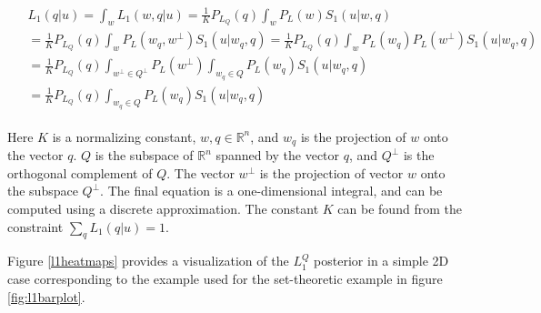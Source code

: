 \documentclass[OpenMind]{stjour}
\newcommand{\Listener}{L}
\newcommand{\QLONE}{\Listener_{{1}}^{{Q}}}
\begin{document}



















	 \begin{align}
	 \begin{split}
	&L_1(q | u) = \int_{w}L_1(w,q | u)
	= \frac{1}{K}P_{L_Q}(q) \int_{w}P_L(w)S_1(u|w,q)  \\
	&= \frac{1}{K}P_{L_Q}(q) \int_{w}P_L(w_q, w^\bot)S_1(u|w_q,q) 
	= \frac{1}{K}P_{L_Q}(q) \int_{w}P_L(w_q) P_L(w^\bot)S_1(u|w_q,q) \\
	&= \frac{1}{K}P_{L_Q}(q) \int_{w^\bot \in Q^\bot}P_L(w^\bot)  \int_{w_q \in Q}P_L(w_q) S_1(u|w_q,q) \\
	&= \frac{1}{K}P_{L_Q}(q)  \int_{w_q \in Q}P_L(w_q) S_1(u|w_q,q) \nonumber
	\end{split}
	 \end{align}
	



	Here $K$ is a normalizing constant, $w, q\in \mathbb{R}^n$, and $w_q$ is the projection of $w$ onto the vector $q$. $Q$ is the subspace of $\mathbb{R}^n$ spanned by the vector $q$, and $Q^\bot$ is the orthogonal complement of $Q$. 
	The vector $w^\bot$ is the projection of vector $w$ onto the subspace $Q^\bot$. The final equation is a one-dimensional integral, and can be computed using a discrete approximation. The constant $K$ can be found from the constraint $\sum_q L_1(q|u) = 1$. 

	Figure \ref{l1heatmaps} provides a visualization of the $\QLONE$ posterior in a simple 2D case corresponding to the example used for the set-theoretic example in figure \ref{fig:l1barplot}.
\end{document}
